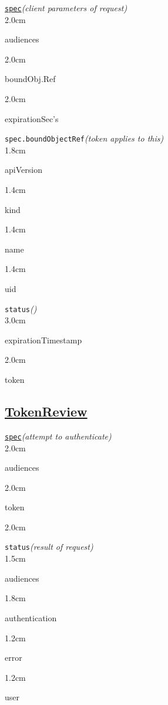 \texttt{\href{https://kubernetes.io/docs/reference/kubernetes-api/authentication-resources/token-request-v1/}{spec}}\quad\textit{(client parameters of request)}\\[-2mm]
\api
{2.0cm}{
audiences       

}
{2.0cm}{
boundObj.Ref    

}
{2.0cm}{
expirationSec's

}
\stopapi

\texttt{spec.boundObjectRef}\quad\textit{(token applies to this)}\\[-2mm]
\api
{1.8cm}{
apiVersion

}
{1.4cm}{
kind

}
{1.4cm}{
name

}
{1.4cm}{
uid

}
\stopapi



\texttt{status}\quad\textit{()}\\[-2mm]
\api
{3.0cm}{
expirationTimestamp

}
{2.0cm}{
token

}
\stopapi

\subsection*{\href{https://kubernetes.io/docs/reference/access-authn-authz/authentication/\#service-account-tokens}{TokenReview}}


\texttt{\href{https://kubernetes.io/docs/reference/kubernetes-api/authentication-resources/token-review-v1/}{spec}}\quad\textit{(attempt to authenticate)}\\[-2mm]
\api
{2.0cm}{
audiences

}
{2.0cm}{
token

}
{2.0cm}{

}
\stopapi


\texttt{status}\quad\textit{(result of request)}\\[-2mm]
\api
{1.5cm}{
audiences   

}
{1.8cm}{
authentication  

}
{1.2cm}{
error

}
{1.2cm}{
user

}
\stopapi



\begin{comment}

\texttt{spec}\quad\textit{()}\\[-2mm]
\api
{2.0cm}{

}
{2.0cm}{

}
{2.0cm}{

}
\stopapi


\texttt{status}\quad\textit{()}\\[-2mm]
\api
{2.0cm}{

}
{2.0cm}{

}
{2.0cm}{

}
\stopapi



\end{comment}